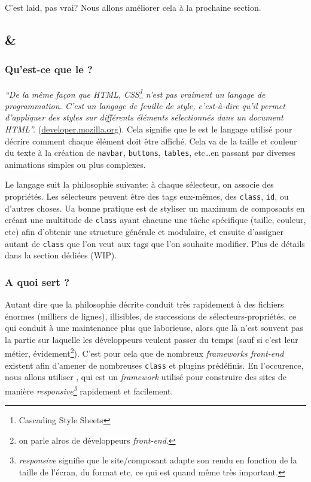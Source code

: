 \documentclass[internal]{nhitec_design}
\begin{document}
C'est laid, pas vrai? Nous allons améliorer cela à la prochaine section.

\newpage

\subsection[Bootstrap et CSS]{\bs{} \& \css{}}
\subsubsection[Qu'est-ce que le CSS?][fr.wikipedia.org/wiki/Feuilles\_de\_style\_en\_cascade]{Qu'est-ce que le \css{}?}\label{sec:css} 
\textit{``De la même façon que HTML, CSS\footnote{Cascading Style Sheets} n'est pas vraiment un langage de programmation. C'est un langage de feuille de style, c'est-à-dire qu'il permet d'appliquer des styles sur différents éléments sélectionnés dans un document HTML''.} (\href{https://developer.mozilla.org/fr/docs/Learn/Getting_started_with_the_web/CSS_basics}{developer.mozilla.org}). Cela signifie que le \css{} est le langage utilisé pour décrire comment chaque élément \html{} doit être affiché. Cela va de la taille et couleur du texte à la création de \verb|navbar|, \verb|buttons|, \verb|tables|, etc\ldots en passant par diverses animations simples ou plus complexes.

Le langage suit la philosophie suivante: à chaque sélecteur, on associe des propriétés. Les sélecteurs peuvent être des tags \html{} eux-mêmes, des \verb|class|, \verb|id|, ou d'autres choses. Ua bonne pratique est de styliser un maximum de composants en créant une multitude de \verb|class| ayant chacune une tâche spécifique (taille, couleur, etc) afin d'obtenir une structure générale et modulaire, et ensuite d'assigner autant de \verb|class| que l'on veut aux tags \html{} que l'on souhaite modifier. Plus de détails dans la section dédiées (WIP).

\subsubsection[A quoi sert Bootstrap?][fr.wikipedia.org/wiki/Bootstrap\_(framework)]{A quoi sert \bs{}?}
Autant dire que la philosophie décrite conduit très rapidement à des fichiers énormes (milliers de lignes), illisibles, de successions de sélecteurs-propriétés, ce qui conduit à une maintenance plus que laborieuse, alors que là n'est souvent pas la partie sur laquelle les développeurs veulent passer du temps (sauf si c'est leur métier, évidement\footnote{on parle alros de développeurs \textit{front-end}.}). C'est pour cela que de nombreux \textit{frameworks front-end} existent afin d'amener de nombreuses \verb|class| et plugins \js{} prédéfinis. En l'occurence, nous allons utiliser \bs{}, qui est un \textit{framework} utilisé pour construire des sites de manière \textit{responsive\footnote{\textit{responsive} signifie que le site/composant adapte son rendu en fonction de la taille de l'écran, du format etc, ce qui est quand même très important.}} rapidement et facilement.
\end{document}
